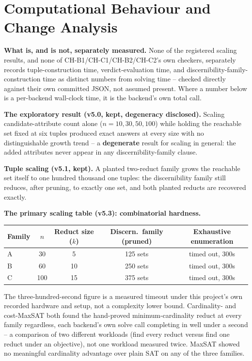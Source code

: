 \documentclass[11pt,a4paper]{article}
\theoremstyle{definition}
\begin{document}
\section{Computational Behaviour and Change Analysis}
\label{sec:computational}

\noindent\textbf{What is, and is not, separately measured.} None of the registered scaling results, and none of CH-B1/CH-C1/CH-B2/CH-C2's own checkers, separately records tuple-construction time, verdict-evaluation time, and discernibility-family-construction time as distinct numbers from solving time -- checked directly against their own committed JSON, not assumed present. Where a number below is a per-backend wall-clock time, it is the backend's own total call.

\noindent\textbf{The exploratory result (v5.0, kept, degeneracy disclosed).} Scaling candidate-attribute count alone ($n = 10, 30, 50, 100$) while holding the reachable set fixed at six tuples produced exact answers at every size with no distinguishable growth trend -- a \textbf{degenerate} result for scaling in general: the added attributes never appear in any discernibility-family clause.

\noindent\textbf{Tuple scaling (v5.1, kept).} A planted two-reduct family grows the reachable set itself to one hundred thousand one tuples: the discernibility family still reduces, after pruning, to exactly one set, and both planted reducts are recovered exactly.

\noindent\textbf{The primary scaling table (v5.3): combinatorial hardness.}

\begin{center}
\begin{tabular}{lcccc}
\toprule
Family & $n$ & Reduct size ($k$) & Discern.\ family (pruned) & Exhaustive enumeration \\
\midrule
A & 30 & 5 & 125 sets & timed out, 300s \\
B & 60 & 10 & 250 sets & timed out, 300s \\
C & 100 & 15 & 375 sets & timed out, 300s \\
\bottomrule
\end{tabular}
\end{center}

The three-hundred-second figure is a measured timeout under this project's own recorded hardware and setup, not a complexity lower bound. Cardinality- and cost-MaxSAT both found the hand-proved minimum-cardinality reduct at every family regardless, each backend's own solve call completing in well under a second -- a comparison of two different workloads (find every reduct versus find one reduct under an objective), not one workload measured twice. MaxSAT showed no meaningful cardinality advantage over plain SAT on any of the three families.
\end{document}
